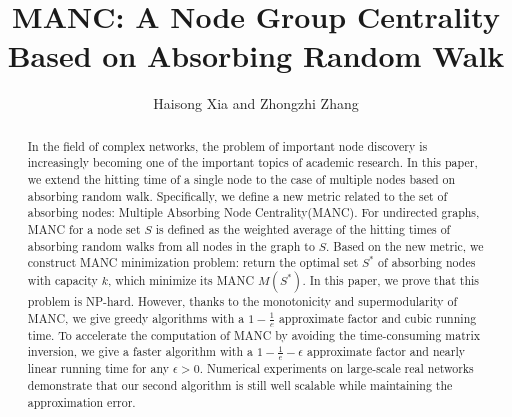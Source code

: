 \documentclass[sigconf]{acmart}
\begin{document}
\sloppy
\fancyhead{}
\title{MANC: A Node Group Centrality Based on Absorbing Random Walk}
\author{Haisong Xia and Zhongzhi Zhang \footnotemark}
\begin{abstract}
    In the field of complex networks, the problem of important node discovery is increasingly becoming one of the important topics of academic research.
    In this paper, we extend the hitting time of a single node to the case of multiple nodes based on absorbing random walk.
    Specifically, we define a new metric related to the set of absorbing nodes: Multiple Absorbing Node Centrality(MANC).
    For undirected graphs, MANC for a node set \(S\) is defined as the weighted average of the hitting times of absorbing random walks from all nodes in the graph to \(S\).
    Based on the new metric, we construct MANC minimization problem: return the optimal set \(S^*\) of absorbing nodes with capacity \(k\), which minimize its MANC \(M(S^*)\).
    In this paper, we prove that this problem is NP-hard. However, thanks to the monotonicity and supermodularity of MANC, we give greedy algorithms with a \(1-\frac{1}{e}\) approximate factor and cubic running time.
    To accelerate the computation of MANC by avoiding the time-consuming matrix inversion, we give a faster algorithm with a \(1-\frac{1}{e}-\epsilon\) approximate factor and nearly linear running time for any \(\epsilon>0\). Numerical experiments on large-scale real networks demonstrate that our second algorithm is still well scalable while maintaining the approximation error.
\end{abstract}
\maketitle
\renewcommand{\thefootnote}{*}
\end{document}
